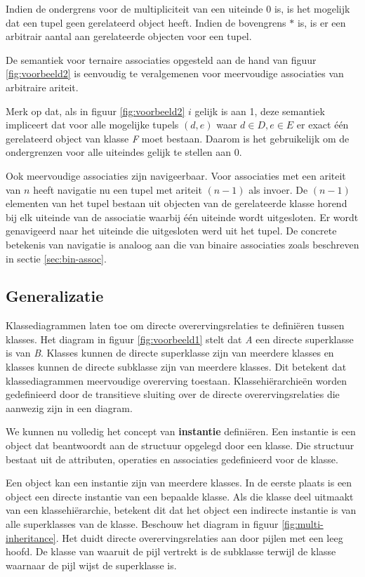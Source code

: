 Indien de ondergrens voor de multipliciteit van een uiteinde $0$ is, is het mogelijk dat een tupel geen gerelateerd object heeft. Indien de bovengrens $*$ is, is er een arbitrair aantal aan gerelateerde objecten voor een tupel.

De semantiek voor ternaire associaties opgesteld aan de hand van figuur \ref{fig:voorbeeld2} is eenvoudig te veralgemenen voor meervoudige associaties van arbitraire ariteit.

Merk op dat, als in figuur \ref{fig:voorbeeld2} $i$ gelijk is aan 1, deze semantiek impliceert dat voor alle mogelijke tupels $(d,e)$ waar $d \in D, e \in E$ er exact \'e\'en gerelateerd object van klasse \textit{F} moet bestaan. Daarom is het gebruikelijk om de ondergrenzen voor alle uiteindes gelijk te stellen aan 0.

Ook meervoudige associaties zijn navigeerbaar. Voor associaties met een ariteit van $n$ heeft navigatie nu een tupel met ariteit $(n-1)$ als invoer. De $(n-1)$ elementen van het tupel bestaan uit objecten van de gerelateerde klasse horend bij elk uiteinde van de associatie waarbij \'e\'en uiteinde wordt uitgesloten. Er wordt genavigeerd naar het uiteinde die uitgesloten werd uit het tupel. De concrete betekenis van navigatie is analoog aan die van binaire associaties zoals beschreven in sectie \ref{sec:bin-assoc}.

\subsection{Generalizatie}\label{sec:semantics-gen}

Klassediagrammen laten toe om directe overervingsrelaties te defini\"eren tussen klasses. Het diagram in figuur \ref{fig:voorbeeld1} stelt dat \textit{A} een directe superklasse is van \textit{B}. Klasses kunnen de directe superklasse zijn van meerdere klasses en klasses kunnen de directe subklasse zijn van meerdere klasses. Dit betekent dat klassediagrammen meervoudige overerving toestaan. Klassehi\"erarchie\"en worden gedefinieerd door de transitieve sluiting over de directe overervingsrelaties die aanwezig zijn in een diagram.

We kunnen nu volledig het concept van \textbf{instantie} defini\"eren. Een instantie is een object dat beantwoordt aan de structuur opgelegd door een klasse. Die structuur bestaat uit de attributen, operaties en associaties gedefinieerd voor de klasse.

Een object kan een instantie zijn van meerdere klasses. In de eerste plaats is een object een directe instantie van een bepaalde klasse. Als die klasse deel uitmaakt van een klassehi\"erarchie, betekent dit dat het object een indirecte instantie is van alle superklasses van de klasse. Beschouw het diagram in figuur \ref{fig:multi-inheritance}. Het duidt directe overervingsrelaties aan door pijlen met een leeg hoofd. De klasse van waaruit de pijl vertrekt is de subklasse terwijl de klasse waarnaar de pijl wijst de superklasse is.

